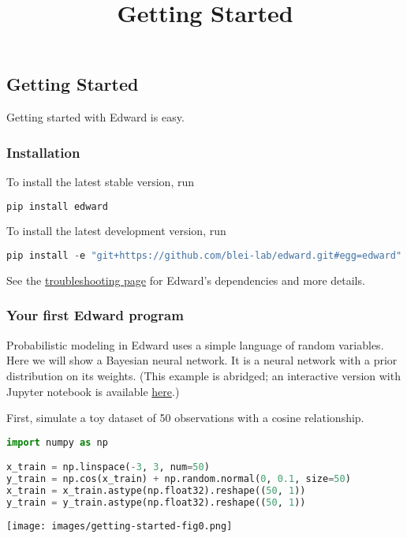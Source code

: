 \title{Getting Started}

\subsection{Getting Started}
Getting started with Edward is easy.

\subsubsection{Installation}

To install the latest stable version, run

\begin{lstlisting}[language=Java]
pip install edward
\end{lstlisting}

To install the latest development version, run

\begin{lstlisting}[language=Java]
pip install -e "git+https://github.com/blei-lab/edward.git#egg=edward"
\end{lstlisting}

See the \href{/troubleshooting}{troubleshooting page} for
Edward's dependencies and more details.


\subsubsection{Your first Edward program}

Probabilistic modeling in Edward uses a simple language of
random variables.
Here we will show a Bayesian neural network. It is a neural network
with a prior distribution on its weights.
(This example is abridged; an interactive version with Jupyter notebook is available
\href{http://nbviewer.jupyter.org/github/blei-lab/edward/blob/master/notebooks/getting_started.ipynb}{here}.)

First, simulate a toy dataset of 50 observations with a cosine relationship.

\begin{lstlisting}[language=Python]
import numpy as np

x_train = np.linspace(-3, 3, num=50)
y_train = np.cos(x_train) + np.random.normal(0, 0.1, size=50)
x_train = x_train.astype(np.float32).reshape((50, 1))
y_train = y_train.astype(np.float32).reshape((50, 1))
\end{lstlisting}

\texttt{[image: images/getting-started-fig0.png]}

